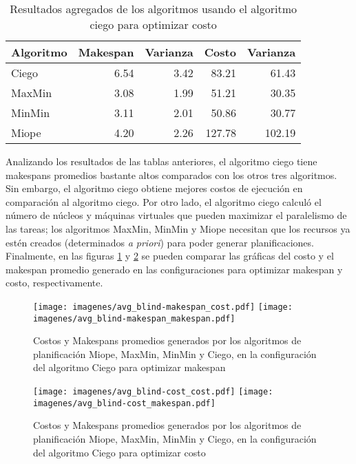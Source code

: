\begin{table}[ht]
\centering
\begin{tabular}{lrrrr}
  \hline
Algoritmo & Makespan & Varianza & Costo & Varianza \\ 
  \hline
  Ciego & 6.54 & 3.42 & 83.21 & 61.43 \\ 
  MaxMin & 3.08 & 1.99 & 51.21 & 30.35 \\ 
  MinMin & 3.11 & 2.01 & 50.86 & 30.77 \\ 
  Miope & 4.20 & 2.26 & 127.78 & 102.19 \\ 
  \hline
\end{tabular}
\caption{Resultados agregados de los algoritmos usando el algoritmo ciego para optimizar costo} 
\label{table:results_cost}
\end{table}


Analizando los resultados de las tablas anteriores, el algoritmo ciego tiene makespans promedios bastante altos comparados con los otros tres algoritmos. Sin embargo, el algoritmo ciego obtiene mejores costos de ejecución en comparación al algoritmo ciego. Por otro lado, el algoritmo ciego calculó el número de núcleos y máquinas virtuales que pueden maximizar el paralelismo de las tareas; los algoritmos MaxMin, MinMin y Miope necesitan que los recursos ya estén creados (determinados \emph{a priori}) para poder generar planificaciones. Finalmente, en  las figuras \ref{fig:avg_blind_makespan} y \ref{fig:avg_blind_cost} se pueden comparar las gráficas del costo y el makespan promedio generado en las configuraciones para optimizar makespan y costo, respectivamente.


\begin{figure}
\begin{center}
\texttt{[image: imagenes/avg\_blind-makespan\_cost.pdf]}
\texttt{[image: imagenes/avg\_blind-makespan\_makespan.pdf]}
\end{center}
\caption{Costos y Makespans promedios generados por los algoritmos de planificación Miope, MaxMin, MinMin y Ciego, en la configuración del algoritmo Ciego para optimizar makespan}
\label{fig:avg_blind_makespan}
\end{figure}


\begin{figure}
\begin{center}
\texttt{[image: imagenes/avg\_blind-cost\_cost.pdf]}
\texttt{[image: imagenes/avg\_blind-cost\_makespan.pdf]}
\end{center}
\caption{Costos y Makespans promedios generados por los algoritmos de planificación Miope, MaxMin, MinMin y Ciego, en la configuración del algoritmo Ciego para optimizar costo}
\label{fig:avg_blind_cost}
\end{figure}
